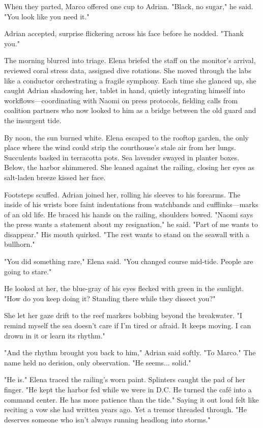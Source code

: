 When they parted, Marco offered one cup to Adrian. "Black, no sugar," he said. "You look like you need it."

Adrian accepted, surprise flickering across his face before he nodded. "Thank you."

The morning blurred into triage. Elena briefed the staff on the monitor's arrival, reviewed coral stress data, assigned dive rotations. She moved through the labs like a conductor orchestrating a fragile symphony. Each time she glanced up, she caught Adrian shadowing her, tablet in hand, quietly integrating himself into workflows—coordinating with Naomi on press protocols, fielding calls from coalition partners who now looked to him as a bridge between the old guard and the insurgent tide.

By noon, the sun burned white. Elena escaped to the rooftop garden, the only place where the wind could strip the courthouse's stale air from her lungs. Succulents basked in terracotta pots. Sea lavender swayed in planter boxes. Below, the harbor shimmered. She leaned against the railing, closing her eyes as salt-laden breeze kissed her face.

Footsteps scuffed. Adrian joined her, rolling his sleeves to his forearms. The inside of his wrists bore faint indentations from watchbands and cufflinks—marks of an old life. He braced his hands on the railing, shoulders bowed. "Naomi says the press wants a statement about my resignation," he said. "Part of me wants to disappear." His mouth quirked. "The rest wants to stand on the seawall with a bullhorn."

"You did something rare," Elena said. "You changed course mid-tide. People are going to stare."

He looked at her, the blue-gray of his eyes flecked with green in the sunlight. "How do you keep doing it? Standing there while they dissect you?"

She let her gaze drift to the reef markers bobbing beyond the breakwater. "I remind myself the sea doesn't care if I'm tired or afraid. It keeps moving. I can drown in it or learn its rhythm."

"And the rhythm brought you back to him," Adrian said softly. "To Marco." The name held no derision, only observation. "He seems... solid."

"He is." Elena traced the railing's worn paint. Splinters caught the pad of her finger. "He kept the harbor fed while we were in D.C. He turned the café into a command center. He has more patience than the tide." Saying it out loud felt like reciting a vow she had written years ago. Yet a tremor threaded through. "He deserves someone who isn't always running headlong into storms."

